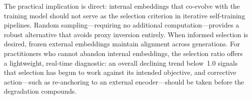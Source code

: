 The practical implication is direct: internal embeddings that co-evolve with the training model should not serve as the selection criterion in iterative self-training pipelines. Random sampling---requiring no additional computation---provides a robust alternative that avoids proxy inversion entirely. When informed selection is desired, frozen external embeddings maintain alignment across generations. For practitioners who cannot abandon internal embeddings, the selection ratio offers a lightweight, real-time diagnostic: an overall declining trend below~1.0 signals that selection has begun to work against its intended objective, and corrective action---such as re-anchoring to an external encoder---should be taken before the degradation compounds.
